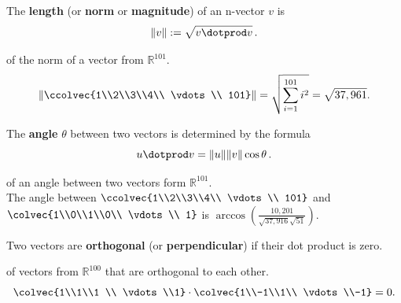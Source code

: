\begin{definition} 
The {\bfseries length} (or {\bfseries norm} or {\bfseries magnitude}) of an n-vector $v$ is 
\[\|v\| := \sqrt{v\dotprod v }\, .\]
\end{definition} 

\begin{example} 
of the norm of a vector from $\mathbb{R}^{101}$.\\
\[\left\| \ccolvec{1\\2\\3\\4\\ \vdots \\ 101}\right\|
= 
\sqrt{\sum_{i=1}^{101} i^2} =   \sqrt{37,961}.
\]
\end{example}

\begin{definition} 
The {\bfseries angle} $\theta$ between two vectors is determined by the formula \[u\dotprod v = \|u\|\|v\|\cos \theta\, .\]
\end{definition}

\begin{example} of an angle between two vectors form $\mathbb{R}^{101}$.\\
The angle between $ \ccolvec{1\\2\\3\\4\\ \vdots \\ 101} $ and 
$
\colvec{1\\0\\1\\0\\ \vdots \\ 1} $
is
$ 
\arccos  \left( \frac{10,201 }{\sqrt{37,916} \sqrt{51} } \right).
$
\end{example}




\begin{definition} 
Two vectors are \hypertarget{orthog}{{\bfseries orthogonal}} (or {\bfseries perpendicular}) if their dot product is zero.
\end{definition} 


\begin{example} of vectors from $\mathbb{R}^{100}$ that are orthogonal to each other.\\
\[
\colvec{1\\1\\1 \\ \vdots \\1} \cdot \colvec{1\\-1\\1\\ \vdots \\-1} =0.
\]
\end{example}

